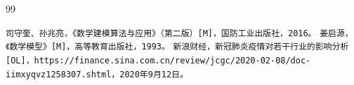 \ifx\allfiles\undefined


\else
\fi


\begin{thebibliography}{99}

	 \verb|司守奎、孙兆亮，《数学建模算法与应用》（第二版）[M]，国防工业出版社，2016。|
	 \verb|姜启源，《数学模型》[M]，高等教育出版社，1993。|
	 \verb|新浪财经，新冠肺炎疫情对若干行业的影响分析[OL]，https://finance.sina.com.cn/review/jcgc/2020-02-08/doc-iimxyqvz1258307.shtml，2020年9月12日。|


\end{thebibliography}


\newpage


\ifx\allfiles\undefined

\fi